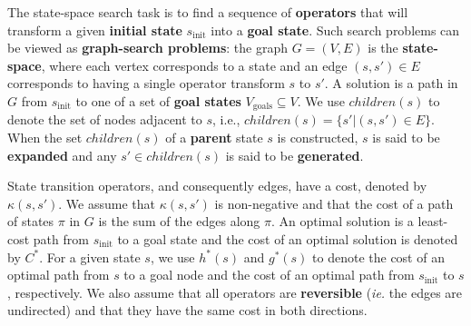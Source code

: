 \documentclass[letterpaper]{article}
\begin{document}

The state-space search task is to find a sequence of \textbf{operators} that will transform  a given \textbf{initial state} $s_{\mathrm{init}}$ into a \textbf{goal state}. Such search problems can be viewed as \textbf{graph-search problems}: the graph $G = (V, E)$ is the \textbf{state-space}, where each vertex corresponds to a state and an edge $(s,s')\in E$ corresponds to having a single operator transform $s$ to $s'$. 
A solution is a path in $G$ from $s_{\mathrm{init}}$ to one of a set of \textbf{goal states} $V_{\mathrm{goals}}\subseteq V$. We use $children(s)$ to denote the set of nodes adjacent to $s$, i.e., $children(s) = \{ s' | (s,s') \in E\}$.  When the 
set $children(s)$ of a \textbf{parent} state $s$ is constructed, $s$ is said to be \textbf{expanded} and any $s'\in children(s)$ is said to be \textbf{generated}.

State transition operators, and consequently edges, have a cost, denoted by $\kappa(s, s')$. We assume that $\kappa(s, s')$ is non-negative and that the cost of a path of states $\pi$ in $G$ is the sum of the edges along $\pi$. An optimal solution is a least-cost path from $s_{\mathrm{init}}$ to a goal state and the cost of an optimal solution is denoted by $C^*$. For a given state $s$, we use $h^*(s)$ and $g^*(s)$ to denote the cost of an optimal path from $s$ to a goal node and the cost of an optimal path from $s_{\mathrm{init}}$ to $s$, respectively. %
We also assume that all operators are \textbf{reversible} (\textit{ie.} the edges are undirected) and that they have the same cost in both directions.
\end{document}
